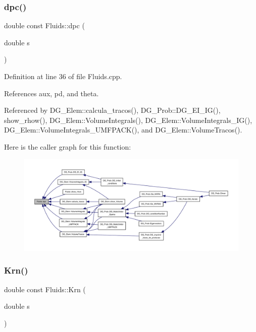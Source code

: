 \subsubsection{\texorpdfstring{dpc()}{dpc()}}
{\footnotesize\ttfamily double const Fluids\+::dpc (\begin{DoxyParamCaption}\item[{double}]{s }\end{DoxyParamCaption})}



Definition at line 36 of file Fluids.\+cpp.



References aux, pd, and theta.



Referenced by D\+G\+\_\+\+Elem\+::calcula\+\_\+tracos(), D\+G\+\_\+\+Prob\+::\+D\+G\+\_\+\+E\+I\+\_\+\+I\+G(), show\+\_\+rhow(), D\+G\+\_\+\+Elem\+::\+Volume\+Integrals(), D\+G\+\_\+\+Elem\+::\+Volume\+Integrals\+\_\+\+I\+G(), D\+G\+\_\+\+Elem\+::\+Volume\+Integrals\+\_\+\+U\+M\+F\+P\+A\+C\+K(), and D\+G\+\_\+\+Elem\+::\+Volume\+Tracos().

Here is the caller graph for this function\+:
\nopagebreak
\begin{figure}[H]
\begin{center}
\leavevmode
\includegraphics[width=350pt]{classFluids_aa332e363bb05e9c5559386000241d66f_icgraph}
\end{center}
\end{figure}
\mbox{\label{classFluids_a01d25f71f5c00a566032c19bd63a473f}} 
\subsubsection{\texorpdfstring{Krn()}{Krn()}}
{\footnotesize\ttfamily double const Fluids\+::\+Krn (\begin{DoxyParamCaption}\item[{double}]{s }\end{DoxyParamCaption})}



